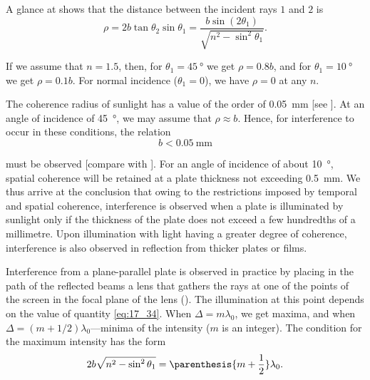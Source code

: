 A glance at  shows that the distance between the incident rays $1$ and $2$ is
\begin{equation}\label{eq:17_37}
    \rho = 2b\tan\theta_2\sin\theta_1 = \frac{b \sin(2\theta_1)}{\sqrt{n^2 - \sin^2\theta_1}}.
\end{equation}

\noindent
If we assume that $n=1.5$, then, for $\theta_1=\SI{45}{\degree}$ we get $\rho=0.8b$, and for $\theta_1=\SI{10}{\degree}$ we get $\rho=0.1b$.
For normal incidence ($\theta_1=0$), we have $\rho=0$ at any $n$.

The coherence radius of sunlight has a value of the order of \SI{0.05}{\milli\metre} [see ].
At an angle of incidence of \SI{45}{\degree}, we may assume that $\rho\approx b$.
Hence, for interference to occur in these conditions, the relation
\begin{equation}\label{eq:17_38}
    b < \SI{0.05}{\milli\metre}
\end{equation}

\noindent
must be observed [compare with ].
For an angle of incidence of about \SI{10}{\degree}, spatial coherence will be retained at a plate thickness not exceeding \SI{0.5}{\milli\metre}.
We thus arrive at the conclusion that owing to the restrictions imposed by temporal and spatial coherence, interference is observed when a plate is illuminated by sunlight only if the thickness of the plate does not exceed a few hundredths of a millimetre.
Upon illumination with light having a greater degree of coherence, interference is also observed in reflection from thicker plates or films.

Interference from a plane-parallel plate is observed in practice by placing in the path of the reflected beams a lens that gathers the rays at one of the points of the screen in the focal plane of the lens ().
The illumination at this point depends on the value of quantity \eqref{eq:17_34}.
When $\Delta=m\lambda_0$, we get maxima, and when $\Delta=(m+1/2)\lambda_0$---minima of the intensity ($m$ is an integer).
The condition for the maximum intensity has the form
\begin{equation}\label{eq:17_39}
    2b \sqrt{n^2 - \sin^2\theta_1} = \parenthesis{m + \frac{1}{2}} \lambda_0.
\end{equation}

